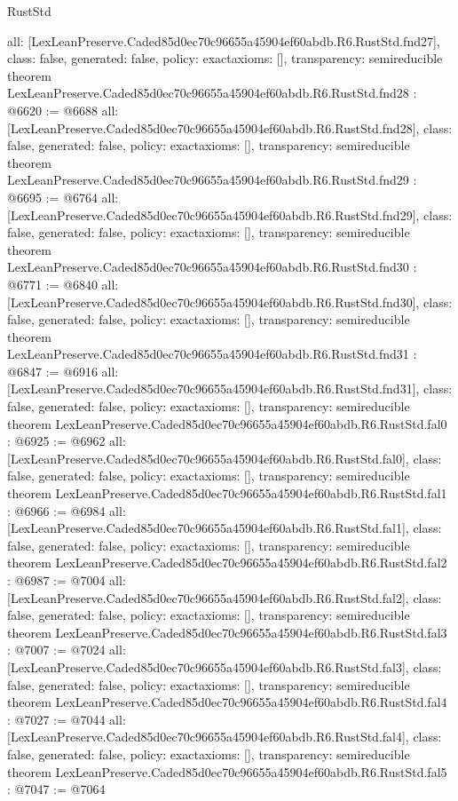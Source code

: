 \begin{lexlean}{RustStd}
\begin{coremodule}
{  all: [LexLeanPreserve.Caded85d0ec70c96655a45904ef60abdb.R6.RustStd.fnd27],
  class: false,
  generated: false,
  policy: exact{axioms: []},
  transparency: semireducible
}
theorem LexLeanPreserve.Caded85d0ec70c96655a45904ef60abdb.R6.RustStd.fnd28 : @6620 := @6688 {
  all: [LexLeanPreserve.Caded85d0ec70c96655a45904ef60abdb.R6.RustStd.fnd28],
  class: false,
  generated: false,
  policy: exact{axioms: []},
  transparency: semireducible
}
theorem LexLeanPreserve.Caded85d0ec70c96655a45904ef60abdb.R6.RustStd.fnd29 : @6695 := @6764 {
  all: [LexLeanPreserve.Caded85d0ec70c96655a45904ef60abdb.R6.RustStd.fnd29],
  class: false,
  generated: false,
  policy: exact{axioms: []},
  transparency: semireducible
}
theorem LexLeanPreserve.Caded85d0ec70c96655a45904ef60abdb.R6.RustStd.fnd30 : @6771 := @6840 {
  all: [LexLeanPreserve.Caded85d0ec70c96655a45904ef60abdb.R6.RustStd.fnd30],
  class: false,
  generated: false,
  policy: exact{axioms: []},
  transparency: semireducible
}
theorem LexLeanPreserve.Caded85d0ec70c96655a45904ef60abdb.R6.RustStd.fnd31 : @6847 := @6916 {
  all: [LexLeanPreserve.Caded85d0ec70c96655a45904ef60abdb.R6.RustStd.fnd31],
  class: false,
  generated: false,
  policy: exact{axioms: []},
  transparency: semireducible
}
theorem LexLeanPreserve.Caded85d0ec70c96655a45904ef60abdb.R6.RustStd.fal0 : @6925 := @6962 {
  all: [LexLeanPreserve.Caded85d0ec70c96655a45904ef60abdb.R6.RustStd.fal0],
  class: false,
  generated: false,
  policy: exact{axioms: []},
  transparency: semireducible
}
theorem LexLeanPreserve.Caded85d0ec70c96655a45904ef60abdb.R6.RustStd.fal1 : @6966 := @6984 {
  all: [LexLeanPreserve.Caded85d0ec70c96655a45904ef60abdb.R6.RustStd.fal1],
  class: false,
  generated: false,
  policy: exact{axioms: []},
  transparency: semireducible
}
theorem LexLeanPreserve.Caded85d0ec70c96655a45904ef60abdb.R6.RustStd.fal2 : @6987 := @7004 {
  all: [LexLeanPreserve.Caded85d0ec70c96655a45904ef60abdb.R6.RustStd.fal2],
  class: false,
  generated: false,
  policy: exact{axioms: []},
  transparency: semireducible
}
theorem LexLeanPreserve.Caded85d0ec70c96655a45904ef60abdb.R6.RustStd.fal3 : @7007 := @7024 {
  all: [LexLeanPreserve.Caded85d0ec70c96655a45904ef60abdb.R6.RustStd.fal3],
  class: false,
  generated: false,
  policy: exact{axioms: []},
  transparency: semireducible
}
theorem LexLeanPreserve.Caded85d0ec70c96655a45904ef60abdb.R6.RustStd.fal4 : @7027 := @7044 {
  all: [LexLeanPreserve.Caded85d0ec70c96655a45904ef60abdb.R6.RustStd.fal4],
  class: false,
  generated: false,
  policy: exact{axioms: []},
  transparency: semireducible
}
theorem LexLeanPreserve.Caded85d0ec70c96655a45904ef60abdb.R6.RustStd.fal5 : @7047 := @7064 {
}
\end{coremodule}
\end{lexlean}
